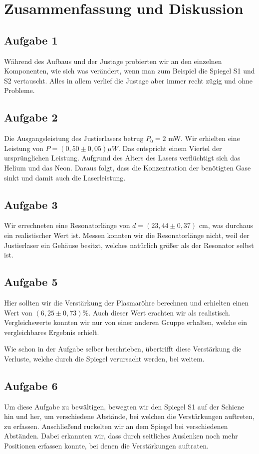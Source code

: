 \section{Zusammenfassung und Diskussion}

\subsection*{Aufgabe 1}
Während des Aufbaus und der Justage probierten wir an den einzelnen Komponenten, wie sich was verändert, wenn man zum Beispiel die Spiegel S1 und S2 vertauscht. Alles in allem verlief die Justage aber immer recht zügig und ohne Probleme.

\subsection*{Aufgabe 2}
Die Ausgangsleistung des Justierlasers betrug $P_0 = 2$ mW. Wir erhielten eine Leistung von $P = (0,50 \pm 0,05)\mu W$. Das entspricht einem Viertel der ursprünglichen Leistung. Aufgrund des Alters des Lasers verflüchtigt sich das Helium und das Neon. Daraus folgt, dass die Konzentration der benötigten Gase sinkt und damit auch die Laserleistung.

\subsection*{Aufgabe 3}
Wir errechneten eine Resonatorlänge von $d = (23,44 \pm 0,37)$ cm, was durchaus ein realistischer Wert ist. Messen konnten wir die Resonatorlänge nicht, weil der Justierlaser ein Gehäuse besitzt, welches natürlich größer als der Resonator selbst ist.

\subsection*{Aufgabe 5}
Hier sollten wir die Verstärkung der Plasmaröhre berechnen und erhielten einen Wert von $(6,25 \pm 0,73)\%$. Auch dieser Wert erachten wir als realistisch. Vergleichswerte konnten wir nur von einer anderen Gruppe erhalten, welche ein vergleichbares Ergebnis erhielt.

Wie schon in der Aufgabe selber beschrieben, übertrifft diese Verstärkung die Verluste, welche durch die Spiegel verursacht werden, bei weitem.

\subsection*{Aufgabe 6}
Um diese Aufgabe zu bewältigen, bewegten wir den Spiegel S1 auf der Schiene hin und her, um verschiedene Abstände, bei welchen die Verstärkungen auftreten, zu erfassen. Anschließend ruckelten wir an dem Spiegel bei verschiedenen Abständen. Dabei erkannten wir, dass durch seitliches Auslenken noch mehr Positionen erfassen konnte, bei denen die Verstärkungen auftraten.

